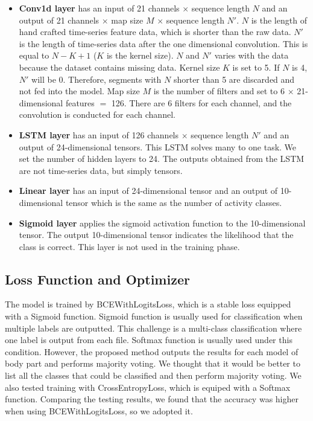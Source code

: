 \documentclass[graybox]{svmult}
\begin{document}
\begin{itemize}
    \item {\bf Conv1d layer} has an input of 21 channels $\times$ sequence length $N$ and an output of 21 channels $\times$ map size $M$ $\times$ sequence length $N'$. $N$ is the length of hand crafted time-series feature data, which is shorter than the raw data. $N'$ is the length of time-series data after the one dimensional convolution. This is equal to $N-K+1$ ($K$ is the kernel size). $N$ and $N'$ varies with the data because the dataset contains missing data. Kernel size $K$ is set to 5. If $N$ is 4, $N'$ will be 0. Therefore, segments with $N$ shorter than 5 are discarded and not fed into the model. Map size $M$ is the number of filters and set to 6 $\times$ 21-dimensional features $=$ 126. There are 6 filters for each channel, and the convolution is conducted for each channel.
    
    \item {\bf LSTM layer} has an input of 126 channels $\times$ sequence length $N'$ and an output of 24-dimensional tensors. This LSTM solves many to one task. We set the number of hidden layers to 24. The outputs obtained from the LSTM are not time-series data, but simply tensors.
    
    \item {\bf Linear layer} has an input of 24-dimensional tensor and an output of 10-dimensional tensor which is the same as the number of activity classes.
    
    \item {\bf Sigmoid layer} applies the sigmoid activation function to the 10-dimensional tensor. The output 10-dimensional tensor indicates the likelihood that the class is correct. This layer is not used in the training phase.
\end{itemize}


\subsection{Loss Function and Optimizer}
The model is trained by BCEWithLogitsLoss, which is a stable loss equipped with a Sigmoid function. Sigmoid function is usually used for classification when multiple labels are outputted. This challenge is a multi-class classification where one label is output from each file. Softmax function is usually used under this condition. However, the proposed method outputs the results for each model of body part and performs majority voting. We thought that it would be better to list all the classes that could be classified and then perform majority voting. We also tested training with CrossEntropyLoss, which is equiped with a Softmax function. Comparing the testing results, we found that the accuracy was higher when using BCEWithLogitsLoss, so we adopted it.
\end{document}
